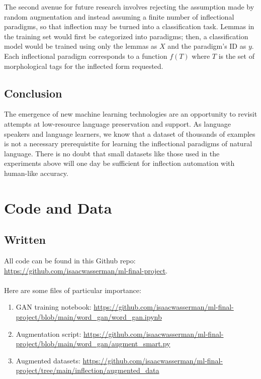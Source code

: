\documentclass{article}
\begin{document}
      The second avenue for future research involves rejecting the assumption made by random augmentation and instead assuming a finite number of inflectional paradigms, so that inflection may be turned into a classification task. Lemmas in the training set would first be categorized into paradigms; then, a classification model would be trained using only the lemmas as $X$ and the paradigm's ID as $y$. Each inflectional paradigm corresponds to a function $f(T)$ where $T$ is the set of morphological tags for the inflected form requested.

    \subsection{Conclusion}
      The emergence of new machine learning technologies are an opportunity to revisit attempts at low-resource language preservation and support. As language speakers and language learners, we know that a dataset of thousands of examples is not a necessary prerequistite for learning the inflectional paradigms of natural language. There is no doubt that small datasets like those used in the experiments above will one day be sufficient for inflection automation with human-like accuracy. 

    \section*{Code and Data}
    \subsection*{Written}
      All code can be found in this Github repo: \url{https://github.com/isaacwasserman/ml-final-project}.\\
      \\Here are some files of particular importance:
      \begin{enumerate}
        \item GAN training notebook: \url{https://github.com/isaacwasserman/ml-final-project/blob/main/word_gan/word_gan.ipynb}
        \item Augmentation script: \url{https://github.com/isaacwasserman/ml-final-project/blob/main/word_gan/augment_smart.py}
        \item Augmented datasets: \url{https://github.com/isaacwasserman/ml-final-project/tree/main/inflection/augmented_data}
      \end{enumerate}
\end{document}
